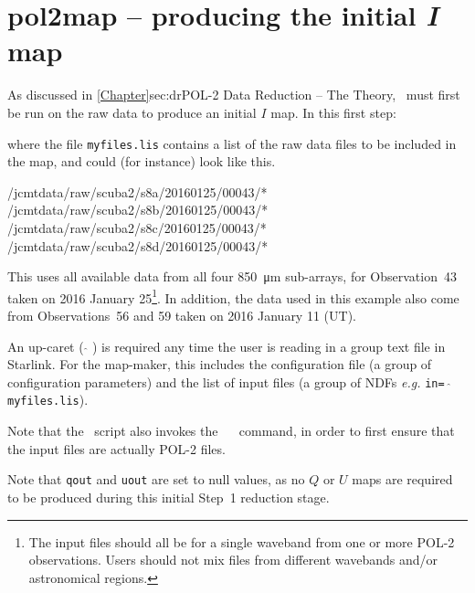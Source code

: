 \begin{terminalv}
\end{terminalv}


\section{pol2map -- producing the initial \textit{I} map}
\label{sec:how-step1}

As discussed in \cref{Chapter}{sec:dr}{POL-2 Data Reduction -- The
  Theory}, \poltwomap\ must first be run on the raw data to produce an
initial $I$ map.  In this first step:

\begin{terminalv}
\end{terminalv}

where the file \texttt{myfiles.lis} contains a list of the raw data
files to be included in the map, and could (for instance) look like
this.

\begin{terminalv}
/jcmtdata/raw/scuba2/s8a/20160125/00043/*
/jcmtdata/raw/scuba2/s8b/20160125/00043/*
/jcmtdata/raw/scuba2/s8c/20160125/00043/*
/jcmtdata/raw/scuba2/s8d/20160125/00043/*
\end{terminalv}

This uses all available data from all four \SI{850}{\micro\metre} sub-arrays, for
  Observation~43 taken on 2016 January 25\footnote{The input files
  should all be for a single waveband from one or more POL-2
  observations. Users should not mix files from different wavebands and/or
  astronomical regions.}. In addition, the data used in this example
  also come from Observations~56 and 59 taken on 2016 January 11 (UT).

\begin{tip}
  An up-caret ( $ \hat{} $ ) is required any time the user is reading in
  a group text file in Starlink. For the map-maker, this includes the
  configuration file (a group of configuration parameters) and the
  list of input files (a group of NDFs \emph{e.g.} \texttt{in= $
    \hat{} $ myfiles.lis}).

  Note that the \poltwomap\ script also invokes the \ \smurf\
   command, in order to 
  first ensure that the input files are actually POL-2 files.
\end{tip}

Note that \texttt{qout} and \texttt{uout} are set to null values, as no
$Q$ or $U$ maps are required to be produced during this initial Step~1
reduction stage.

